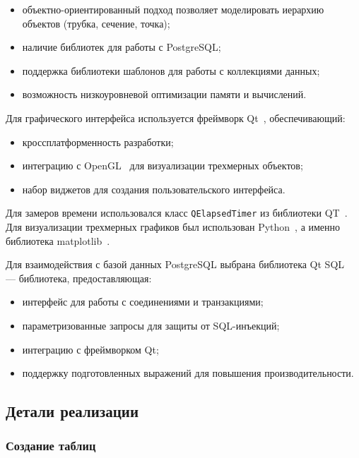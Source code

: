 \begin{itemize}
    \item объектно-ориентированный подход позволяет моделировать иерархию объектов (трубка, сечение, точка);
    \item наличие библиотек для работы с PostgreSQL;
    \item поддержка библиотеки шаблонов для работы с коллекциями данных;
    \item возможность низкоуровневой оптимизации памяти и вычислений.
\end{itemize}

\noindent
\hspace{1.25cm}
Для графического интерфейса используется фреймворк Qt~\cite{qt}, обеспечивающий:
\begin{itemize}
    \item кроссплатформенность разработки;
    \item интеграцию с OpenGL~\cite{opengl} для визуализации трехмерных объектов;
    \item набор виджетов для создания пользовательского интерфейса.
\end{itemize}


\noindent
\hspace{1.25cm}
Для замеров времени использовался класс \texttt{QElapsedTimer} из библиотеки QT~\cite{qt}. Для визуализации трехмерных графиков был использован Python~\cite{python}, а именно библиотека matplotlib~\cite{matplotlib}.


\noindent
\hspace{1.25cm}
Для взаимодействия с базой данных PostgreSQL выбрана библиотека Qt SQL~\cite{qtsql} --- библиотека, предоставляющая:
\begin{itemize}
    \item интерфейс для работы с соединениями и транзакциями;
    \item параметризованные запросы для защиты от SQL-инъекций;
    \item интеграцию с фреймворком Qt;
    \item поддержку подготовленных выражений для повышения производительности.
\end{itemize}

\subsection{Детали реализации}

\subsubsection{Создание таблиц}


